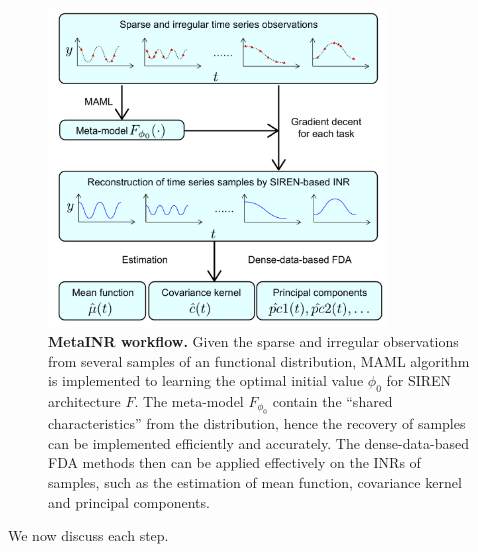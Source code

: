 \documentclass{article}
\begin{document}
\begin{figure}[htb]
  \centering
  \includegraphics[width=0.8\textwidth]{illustration.pdf}
  \caption{\textbf{MetaINR workflow.} Given the sparse and irregular observations from several samples of an functional distribution, MAML algorithm is implemented to learning the optimal initial value $\phi_0$ for SIREN architecture $F$. The meta-model $F_{\phi_0}$ contain the ``shared characteristics'' from the distribution, hence the recovery of samples can be implemented efficiently and accurately.
  The dense-data-based FDA methods then can be applied effectively on the INRs of samples, such as the estimation of mean function, covariance kernel and principal components.}
  \label{MetaINR workflow}
\end{figure}

We now discuss each step.
\end{document}
